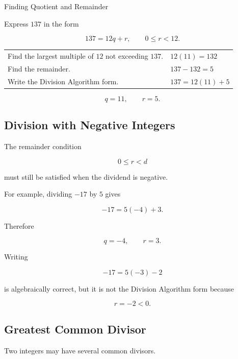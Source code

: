 \begin{workedexamplebox}{Finding Quotient and Remainder}

Express \(137\) in the form

\[ 137=12q+r,\qquad 0\leq r<12. \]

\begin{tabularx}{\textwidth}{@{}>{\raggedright\arraybackslash}p{}X@{}}
Find the largest multiple of \(12\) not exceeding \(137\). &
\(12(11)=132\)\\
Find the remainder. &
\(137-132=5\)\\
Write the Division Algorithm form. &
\(137=12(11)+5\)
\end{tabularx}

\begin{answerbox}
\[ \boxed{q=11,\qquad r=5.} \]
\end{answerbox}
\end{workedexamplebox}

\subsection{Division with Negative Integers}
\label{subsec:division-negative-integers}

The remainder condition

\[ 0\leq r<d \]

must still be satisfied when the dividend is negative.

For example, dividing \(-17\) by \(5\) gives

\[ -17=5(-4)+3. \]

Therefore

\[ q=-4,\qquad r=3. \]

Writing

\[ -17=5(-3)-2 \]

is algebraically correct, but it is not the Division Algorithm form because

\[ r=-2<0. \]

\subsection{Greatest Common Divisor}
\label{subsec:greatest-common-divisor}

Two integers may have several common divisors.

